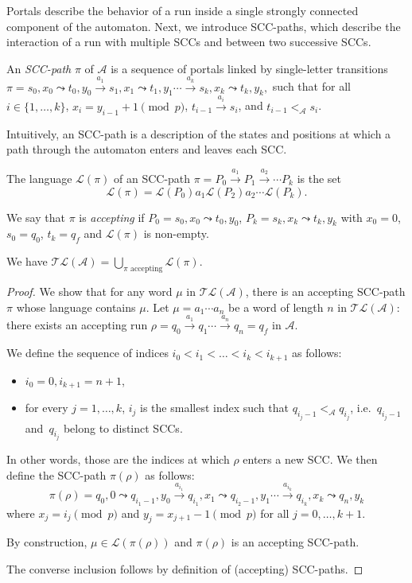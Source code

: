 \documentclass[letterpaper, USenglish, cleveref, autoref, thm-restate, numberwithinsect]{lipics-v2021}
\theoremstyle{theorem}
\theoremstyle{definition}
\newcommand{\Aa}{\mathcal{A}}
\newcommand{\curly}{\mathrel{\leadsto}}
\newcommand{\lang}[1]{\mathcal{L}(#1)}
\newcommand{\portal}[4]{#1,#2 \curly #3, #4}
\newcommand{\SCCpath}{\pi}
\newcommand{\set}[1]{\{ #1 \}}
\newcommand{\timedlang}[1]{\mathcal{TL}( #1 )}
\begin{document}
Portals describe the behavior of a run inside a single strongly connected component of the automaton.
Next, we introduce SCC-paths, which describe the interaction of a run with multiple SCCs and between two successive SCCs.
\begin{definition}
	An \emph{SCC-path} $\pi$ of $\Aa$ is a sequence of portals linked by single-letter transitions
	\(\SCCpath = \portal{s_0}{x_0}{t_0}{y_0} \xrightarrow{a_1} \portal{s_1}{x_1}{t_1}{y_1} \cdots  \xrightarrow{a_{k}} \portal{s_k}{x_k}{t_k}{y_k},\)
	such that for all $i \in \set{1, \ldots, k}$,  $x_i = y_{i-1} +1 \pmod{p}$, $t_{i-1}\xrightarrow{a_i} s_{i}$, and $t_{i-1}  <_{\Aa} s_i$.
\end{definition}
Intuitively, an SCC-path is a description of the states and positions at which a path through the automaton enters and leaves each SCC.

\begin{definition}\label{def:lang-of-sccpath}
	The language $\lang{\SCCpath}$ of an SCC-path $\SCCpath = P_0 \xrightarrow{a_1} P_1 \xrightarrow{a_2}\cdots  P_k$ is the set 
	\[\lang{\SCCpath} = \lang{P_0} a_1 \lang{P_2} a_2 \cdots \lang{P_k}.\]
\end{definition}

We say that $\SCCpath$ is \emph{accepting} if $P_0 = \portal{s_0}{x_0}{t_0}{y_0}$, $P_k = \portal{s_k}{x_k}{t_k}{y_k}$ with $x_0 = 0$, $s_0 = q_{0}$, $t_k = q_{f}$ and $\lang{\SCCpath}$ is non-empty.

\begin{lemma}\label{lemma:lang-path-union}
	We have \(\timedlang{\Aa} = \bigcup_{\SCCpath \text{ accepting}} \lang{\SCCpath}.\)
\end{lemma}
\begin{proof}
	We show that for any word $\mu$ in $\timedlang{\Aa}$, there is an accepting SCC-path $\SCCpath$ whose language contains $\mu$.
	Let $\mu = a_1 \cdots a_n$ be a word of length $n$ in $\timedlang{\Aa}$: there exists an accepting run $\rho = q_0 \xrightarrow{a_1} q_1 \cdots \xrightarrow{a_n} q_n = q_f$ in $\Aa$.
	
	We define the sequence of indices $i_0 < i_1 < \ldots < i_k <i_{k+1}$ as follows:
	\begin{itemize}
		\item $i_0 = 0, i_{k+1} = n+1$,
		\item for every $j=1,\ldots, k$, $i_j$ is the smallest index such that $q_{i_j-1} <_\Aa q_{i_j}$, i.e.~$q_{i_j-1}$ and~$q_{i_j}$ belong to distinct SCCs.
	\end{itemize}
	In other words, those are the indices at which $\rho$ enters a new SCC.
	We then define the SCC-path $\SCCpath(\rho)$ as follows:
	\[\SCCpath(\rho) = 
	\portal{q_0}{0}{q_{i_1-1}}{y_0} \xrightarrow{a_{i_1}} \portal{q_{i_1}}{x_1}{q_{i_2-1}}{y_1} \cdots  \xrightarrow{a_{i_k}} \portal{q_{i_k}}{x_k}{q_n}{y_k} \]
	where $x_j = i_j \pmod{p}$ and $y_j = x_{j+1}-1 \pmod{p}$ for all $j = 0, \ldots, k+1$.
	
	By construction, $\mu \in \lang{\SCCpath(\rho)}$ and $\SCCpath(\rho)$ is an accepting SCC-path.
	
	The converse inclusion follows by definition of (accepting) SCC-paths.
\end{proof}
\end{document}
